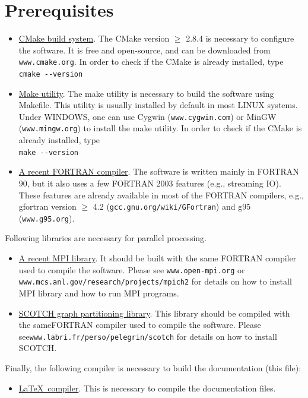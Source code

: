 \section{Prerequisites}
\begin{itemize}[-]
  \item \underline{CMake build system}. The CMake version $\ge$ 2.8.4 is necessary to configure the software. It is free and open-source, and can be downloaded from \texttt{www.cmake.org}. In order to check if the CMake is already installed, type\\
  \texttt{cmake -{}-version}

  \item \underline{Make utility}. The make utility is necessary to build the software using Makefile. This utility is usually installed by default in most LINUX systems. Under WINDOWS, one can use Cygwin (\texttt{www.cygwin.com}) or MinGW (\texttt{www.mingw.org}) to install the make utility.  In order to check if the CMake is already installed, type\\
  \texttt{make -{}-version}
  \item \underline{A recent FORTRAN compiler}. The software is written mainly in FORTRAN 90, but it also uses a few FORTRAN 2003 features (e.g., streaming IO). These features are already available in most of the FORTRAN compilers, e.g., gfortran version $\ge$ 4.2 (\texttt{gcc.gnu.org/wiki/GFortran}) and g95 (\texttt{www.g95.org}).
\end{itemize}
  Following libraries are necessary for parallel processing.
\begin{itemize}[-]
  \item \underline{A recent MPI library}. It should be built with the same FORTRAN compiler used to compile the software. Please see \texttt{www.open-mpi.org} or \linebreak\texttt{www.mcs.anl.gov/research/projects/mpich2} for details on how to install MPI library and how to run MPI programs.
  \item \underline{SCOTCH graph partitioning library}. This library should be compiled with the same\linebreak FORTRAN compiler used to compile the software. Please see\linebreak \texttt{www.labri.fr/perso/pelegrin/scotch} for details on how to install SCOTCH.
\end{itemize}

  Finally, the following compiler is necessary to build the documentation (this file):
\begin{itemize}[-]
  \item \underline{\LaTeX\ compiler}. This is necessary to compile the documentation files.
\end{itemize}

